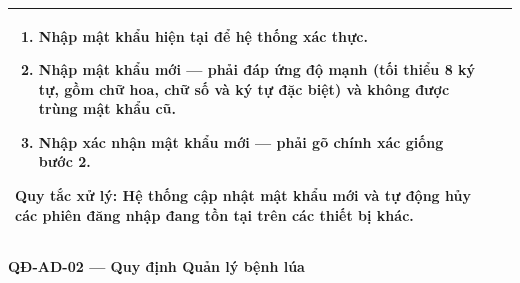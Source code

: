 \documentclass[12pt,a4paper]{article}
\begin{document}
\begin{longtable}{|
        >{\raggedright\arraybackslash}p{2.2cm}|
        >{\raggedright\arraybackslash}p{2.8cm}|
        >{\raggedright\arraybackslash}p{9.8cm}|}
\begin{enumerate}[leftmargin=*,topsep=2pt,itemsep=1pt]
        \item Nhập \textbf{mật khẩu hiện tại} để hệ thống xác thực.
        \item Nhập \textbf{mật khẩu mới} --- phải đáp ứng độ mạnh (tối thiểu 8 ký tự, gồm chữ hoa, chữ số và ký tự đặc biệt) và không được trùng mật khẩu cũ.
        \item Nhập \textbf{xác nhận mật khẩu mới} --- phải gõ chính xác giống bước 2.
    \end{enumerate}
    \textbf{Quy tắc xử lý:} Hệ thống cập nhật mật khẩu mới và tự động hủy các phiên đăng nhập đang tồn tại trên các thiết bị khác. \\
    \hline
\end{longtable}

\vspace{0.3cm}
\noindent\textbf{QĐ-AD-02 --- Quy định Quản lý bệnh lúa}
\end{document}
